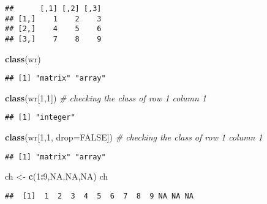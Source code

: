 \documentclass[
]{article}
\newenvironment{Shaded}{\begin{snugshade}}{\end{snugshade}}
\newcommand{\AttributeTok}[1]{\textcolor[rgb]{0.13,0.29,0.53}{#1}}
\newcommand{\CommentTok}[1]{\textcolor[rgb]{0.56,0.35,0.01}{\textit{#1}}}
\newcommand{\ConstantTok}[1]{\textcolor[rgb]{0.56,0.35,0.01}{#1}}
\newcommand{\DecValTok}[1]{\textcolor[rgb]{0.00,0.00,0.81}{#1}}
\newcommand{\FunctionTok}[1]{\textcolor[rgb]{0.13,0.29,0.53}{\textbf{#1}}}
\newcommand{\NormalTok}[1]{#1}
\newcommand{\OtherTok}[1]{\textcolor[rgb]{0.56,0.35,0.01}{#1}}
\newcommand{\SpecialCharTok}[1]{\textcolor[rgb]{0.81,0.36,0.00}{\textbf{#1}}}
\begin{document}
\begin{verbatim}
##      [,1] [,2] [,3]
## [1,]    1    2    3
## [2,]    4    5    6
## [3,]    7    8    9
\end{verbatim}

\begin{Shaded}
\begin{Highlighting}[]
\FunctionTok{class}\NormalTok{(wr)}
\end{Highlighting}
\end{Shaded}

\begin{verbatim}
## [1] "matrix" "array"
\end{verbatim}

\begin{Shaded}
\begin{Highlighting}[]
\FunctionTok{class}\NormalTok{(wr[}\DecValTok{1}\NormalTok{,}\DecValTok{1}\NormalTok{]) }\CommentTok{\# checking the class of row 1 column 1}
\end{Highlighting}
\end{Shaded}

\begin{verbatim}
## [1] "integer"
\end{verbatim}

\begin{Shaded}
\begin{Highlighting}[]
\FunctionTok{class}\NormalTok{(wr[}\DecValTok{1}\NormalTok{,}\DecValTok{1}\NormalTok{, }\AttributeTok{drop=}\ConstantTok{FALSE}\NormalTok{]) }\CommentTok{\# checking the class of row 1 column 1}
\end{Highlighting}
\end{Shaded}

\begin{verbatim}
## [1] "matrix" "array"
\end{verbatim}

\begin{Shaded}
\begin{Highlighting}[]
\NormalTok{ch }\OtherTok{\textless{}{-}} \FunctionTok{c}\NormalTok{(}\DecValTok{1}\SpecialCharTok{:}\DecValTok{9}\NormalTok{,}\ConstantTok{NA}\NormalTok{,}\ConstantTok{NA}\NormalTok{,}\ConstantTok{NA}\NormalTok{)}
\NormalTok{ch}
\end{Highlighting}
\end{Shaded}

\begin{verbatim}
##  [1]  1  2  3  4  5  6  7  8  9 NA NA NA
\end{verbatim}
\end{document}

